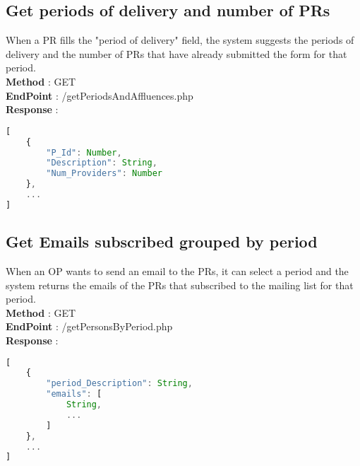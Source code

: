 \subsection{Get periods of delivery and number of PRs}
When a PR fills the "period of delivery" field, the system suggests the periods of delivery and the number of PRs that have already submitted the form for that period.\\
\textbf{Method} : GET \\
\textbf{EndPoint} : /getPeriodsAndAffluences.php \\
\textbf{Response} :
\begin{lstlisting}[language=JavaScript, label={lst:jscode}, basicstyle=\ttfamily]
[
    {
        "P_Id": Number,
        "Description": String,
        "Num_Providers": Number
    },
    ...
]
\end{lstlisting}

\subsection{Get Emails subscribed grouped by period}
When an OP wants to send an email to the PRs, it can select a period and the system returns the emails of the PRs that subscribed to the mailing list for that period.\\
\textbf{Method} : GET \\
\textbf{EndPoint} : /getPersonsByPeriod.php \\
\textbf{Response} :
\begin{lstlisting}[language=JavaScript, label={lst:jscode}, basicstyle=\ttfamily]
[
    {
        "period_Description": String,
        "emails": [
            String,
            ...
        ]
    },
    ...
]
\end{lstlisting}